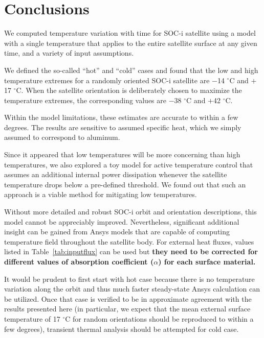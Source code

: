 \documentclass[]{aastex62}
\begin{document}
\section{Conclusions \label{sec:conclusions}} 

We computed temperature variation with time for SOC-i satellite using a model with a single 
temperature that applies to the entire satellite surface at any given time, and a variety of input 
assumptions. 
 
We defined the so-called ``hot'' and ``cold'' cases and found that the low and high temperature 
extremes for a randomly oriented SOC-i satellite are $-$14 $^\circ$C and $+$17 $^\circ$C. When the 
satellite orientation is deliberately chosen to maximize the temperature extremes, the corresponding 
values are $-$38 $^\circ$C and $+$42 $^\circ$C. 

Within the model limitations, these estimates are accurate to within a few degrees. The results are 
sensitive to assumed specific heat, which we simply assumed to correspond to aluminum. 

Since it appeared that low temperatures will be more concerning than high temperatures,
we also explored a toy model for active temperature control that assumes an additional internal 
power dissipation whenever the satellite temperature drops below a pre-defined threshold. 
We found out that such an approach is a viable method for mitigating low temperatures.

Without more detailed and robust SOC-i orbit and orientation descriptions, this model cannot
be appreciably improved. Nevertheless, significant additional insight can be gained from Ansys
models that are capable of computing temperature field throughout the satellite body. For
external heat fluxes, values listed in Table~\ref{tab:inputflux} can be used but {\bf they need
to be corrected for different values of absorption coefficient ($\alpha$) for each surface 
material.} 

It would be prudent to first start with hot case because there is no temperature variation along
the orbit and thus much faster steady-state Ansys calculation can be utilized. Once that case is verified
to be in approximate agreement with the results presented here (in particular, we expect that
the mean external surface temperature of 17 $^\circ$C for random orientations should be reproduced
to within a few degrees), transient thermal analysis should be attempted for cold case. 
\end{document}

